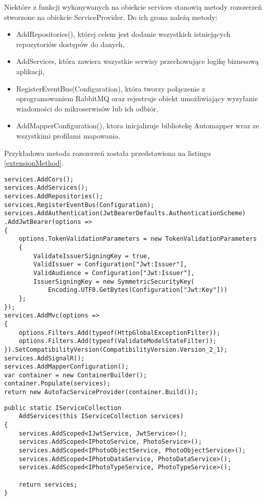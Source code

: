 Niektóre z funkcji wykonywanych na obiekcie services stanowią metody rozszerzeń stworzone na obiekcie ServiceProvider. Do ich grona należą metody:
\begin{itemize}[noitemsep]
	\item AddRepositories(), której celem jest dodanie wszystkich istniejących repozytoriów dostępów do danych,
	\item AddServices, która zawiera wszystkie serwisy przechowujące logikę biznesową aplikacji,
	\item RegisterEventBus(Configuration), która tworzy połączenie z oprogramowaniem RabbitMQ oraz rejestruje obiekt umożliwiający wysyłanie wiadomości do mikroserwisów lub ich odbiór,
	\item AddMapperConfiguration(), ktora inicjalizuje bibliotekę Automapper wraz ze wszystkimi profilami mapowania.
\end{itemize}
Przykładowa metoda rozszerzeń została przedstawiona na listingu \ref{extensionMethod}.
\begin{lstlisting}[caption={Stworzenie obiektów odwróconego sterowania.},label={dependencyInjectionAndConfiguration} ]
services.AddCors();
services.AddServices();
services.AddRepositories();
services.RegisterEventBus(Configuration);
services.AddAuthentication(JwtBearerDefaults.AuthenticationScheme)
.AddJwtBearer(options =>
{
	options.TokenValidationParameters = new TokenValidationParameters
	{
		ValidateIssuerSigningKey = true,
		ValidIssuer = Configuration["Jwt:Issuer"],
		ValidAudience = Configuration["Jwt:Issuer"],
		IssuerSigningKey = new SymmetricSecurityKey(
			Encoding.UTF8.GetBytes(Configuration["Jwt:Key"]))
	};
});
services.AddMvc(options =>
{
	options.Filters.Add(typeof(HttpGlobalExceptionFilter));
	options.Filters.Add(typeof(ValidateModelStateFilter));
}).SetCompatibilityVersion(CompatibilityVersion.Version_2_1);
services.AddSignalR();
services.AddMapperConfiguration();
var container = new ContainerBuilder();
container.Populate(services);
return new AutofacServiceProvider(container.Build());
\end{lstlisting}



\begin{lstlisting}[caption={Metoda rozszerzeń umożliwiająca dodanie serwisów do mechanizmów odwróconego sterowania.},label={extensionMethod}  ]
public static IServiceCollection 
	AddServices(this IServiceCollection services)
{
	services.AddScoped<IJwtService, JwtService>();
	services.AddScoped<IPhotoService, PhotoService>();
	services.AddScoped<IPhotoObjectService, PhotoObjectService>();
	services.AddScoped<IPhotoDataService, PhotoDataService>();
	services.AddScoped<IPhotoTypeService, PhotoTypeService>();
	
	return services;
}
\end{lstlisting}

